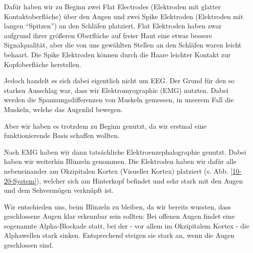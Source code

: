 \documentclass[11pt]{scrartcl}
\begin{document}
	\begin{figure}[h!]
	\end{figure}

	Dafür haben wir zu Beginn zwei Flat Electrodes (Elektroden mit glatter Kontaktoberfläche) über den Augen und zwei Spike Elektroden (Elektroden mit langen \enquote{Spitzen}) an den Schläfen platziert. Flat Elektroden haben zwar aufgrund ihrer größeren Oberfläche auf freier Haut eine etwas bessere Signalqualität, aber die von uns gewählten Stellen an den Schläfen waren leicht behaart. Die Spike Elektroden können durch die Haare leichter Kontakt zur Kopfoberfläche herstellen.

	Jedoch handelt es sich dabei eigentlich nicht um EEG. Der Grund für den so starken Ausschlag war, dass wir Elektromyographie (EMG) nutzten. Dabei werden die Spannungsdifferenzen von Muskeln gemessen, in unserem Fall die Muskeln, welche das Augenlid bewegen. \cite{wiki:EMG}

	Aber wir haben es trotzdem zu Beginn genutzt, da wir erstmal eine funktionierende Basis schaffen wollten.

	Nach EMG haben wir dann tatsächliche Elektroenzephalographie genutzt. Dabei haben wir weiterhin Blinzeln genommen. Die Elektroden haben wir dafür alle nebeneinander am Okzipitalen Kortex (Visueller Kortex) platziert (s. Abb. \ref{10-20-System}), welcher sich am Hinterkopf befindet und sehr stark mit den Augen und dem Sehvermögen verknüpft ist. \cite{Birbaumer2010} 

	Wir entschieden uns, beim Blinzeln zu bleiben, da wir bereits wussten, dass geschlossene Augen klar erkennbar sein sollten: Bei offenen Augen findet eine sogenannte Alpha-Blockade statt, bei der - vor allem im Okzipitalem Kortex - die Alphawellen stark sinken. Entsprechend steigen sie stark an, wenn die Augen geschlossen sind. \cite{Praktikum} \cite{Springer:Berger} \cite{wiki:Berger-Effekt}
\end{document}
